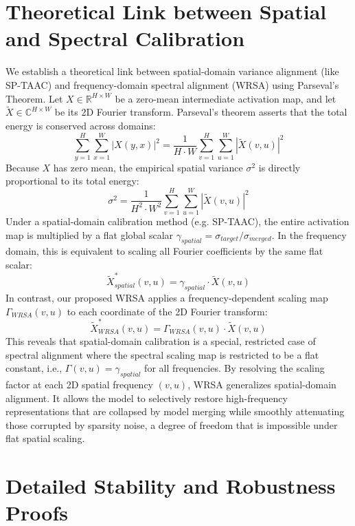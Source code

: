 \documentclass{article}
\theoremstyle{plain}
\theoremstyle{definition}
\theoremstyle{remark}
\begin{document}
\section{Theoretical Link between Spatial and Spectral Calibration}
\label{app:parseval_link}
We establish a theoretical link between spatial-domain variance alignment (like SP-TAAC) and frequency-domain spectral alignment (WRSA) using Parseval's Theorem.
Let $X \in \mathbb{R}^{H \times W}$ be a zero-mean intermediate activation map, and let $\tilde{X} \in \mathbb{C}^{H \times W}$ be its 2D Fourier transform. Parseval's theorem asserts that the total energy is conserved across domains:
\begin{equation}
  \sum_{y=1}^H \sum_{x=1}^W |X(y, x)|^2 = \frac{1}{H \cdot W} \sum_{v=1}^H \sum_{u=1}^W |\tilde{X}(v, u)|^2
\end{equation}
Because $X$ has zero mean, the empirical spatial variance $\sigma^2$ is directly proportional to its total energy:
\begin{equation}
  \sigma^2 = \frac{1}{H^2 \cdot W^2} \sum_{v=1}^H \sum_{u=1}^W |\tilde{X}(v, u)|^2
\end{equation}
Under a spatial-domain calibration method (e.g. SP-TAAC), the entire activation map is multiplied by a flat global scalar $\gamma_{spatial} = \sigma_{target} / \sigma_{merged}$. In the frequency domain, this is equivalent to scaling all Fourier coefficients by the same flat scalar:
\begin{equation}
  \tilde{X}^*_{spatial}(v, u) = \gamma_{spatial} \cdot \tilde{X}(v, u)
\end{equation}
In contrast, our proposed WRSA applies a frequency-dependent scaling map $\Gamma_{WRSA}(v, u)$ to each coordinate of the 2D Fourier transform:
\begin{equation}
  \tilde{X}^*_{WRSA}(v, u) = \Gamma_{WRSA}(v, u) \cdot \tilde{X}(v, u)
\end{equation}
This reveals that spatial-domain calibration is a special, restricted case of spectral alignment where the spectral scaling map is restricted to be a flat constant, i.e., $\Gamma(v, u) = \gamma_{spatial}$ for all frequencies. 
By resolving the scaling factor at each 2D spatial frequency $(v, u)$, WRSA generalizes spatial-domain alignment. It allows the model to selectively restore high-frequency representations that are collapsed by model merging while smoothly attenuating those corrupted by sparsity noise, a degree of freedom that is impossible under flat spatial scaling.

\section{Detailed Stability and Robustness Proofs}
\label{app:proofs_stability_robustness}
\end{document}
